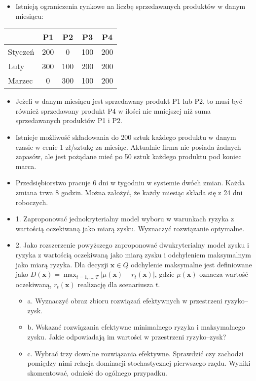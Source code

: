 \documentclass[12pt]{article}
\begin{document}
\begin{itemize}
\item Istnieją ograniczenia rynkowe na liczbę sprzedawanych produktów w danym miesiącu:
\end{itemize}

\begin{table}[h!]
\centering
\begin{tabular}{|l|c|c|c|c|}
\hline
         & P1  & P2  & P3  & P4  \\
\hline
Styczeń & 200 & 0   & 100 & 200 \\
\hline
Luty    & 300 & 100 & 200 & 200 \\
\hline
Marzec  & 0   & 300 & 100 & 200 \\
\hline
\end{tabular}
\end{table}

\begin{itemize}
\item Jeżeli w danym miesiącu jest sprzedawany produkt P1 lub P2, to musi być również sprzedawany produkt P4 w ilości nie mniejszej niż suma sprzedawanych produktów P1 i P2.
\item Istnieje możliwość składowania do 200 sztuk każdego produktu w danym czasie w cenie 1 zł/sztukę za miesiąc. Aktualnie firma nie posiada żadnych zapasów, ale jest pożądane mieć po 50 sztuk każdego produktu pod koniec marca.
\item Przedsiębiorstwo pracuje 6 dni w tygodniu w systemie dwóch zmian. Każda zmiana trwa 8 godzin. Można założyć, że każdy miesiąc składa się z 24 dni roboczych.
\item 1. Zaproponować jednokryterialny model wyboru w warunkach ryzyka z wartością oczekiwaną jako miarą zysku. Wyznaczyć rozwiązanie optymalne.
\item 2. Jako rozszerzenie powyższego zaproponować dwukryterialny model zysku i ryzyka z wartością oczekiwaną jako miarą zysku i odchyleniem maksymalnym jako miarą ryzyka. Dla decyzji $\mathbf{x} \in Q$ odchylenie maksymalne jest definiowane jako $D(\mathbf{x}) = \max_{t=1,...,T} |\mu(\mathbf{x}) - r_t(\mathbf{x})|$, gdzie $\mu(\mathbf{x})$ oznacza wartość oczekiwaną, $r_t(\mathbf{x})$ realizację dla scenariusza $t$.
    \begin{itemize}
    \item a. Wyznaczyć obraz zbioru rozwiązań efektywnych w przestrzeni ryzyko–zysk.
    \item b. Wskazać rozwiązania efektywne minimalnego ryzyka i maksymalnego zysku. Jakie odpowiadają im wartości w przestrzeni ryzyko–zysk?
    \item c. Wybrać trzy dowolne rozwiązania efektywne. Sprawdzić czy zachodzi pomiędzy nimi relacja dominacji stochastycznej pierwszego rzędu. Wyniki skomentować, odnieść do ogólnego przypadku.
    \end{itemize}
\end{itemize}
\end{document}

